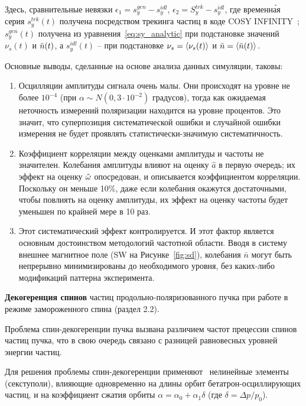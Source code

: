 Здесь, сравнительные невязки ${\epsilon_1 = s_y^{gen} - s_y^{idl}}$, ${\epsilon_2 = S_y^{trk} - s_y^{idl}}$,
где временн\'{а}я серия $s_y^{trk}(t)$ получена посредством трекинга частиц 
в коде COSY INFINITY~\cite{COSYINF:Website}; $s_y^{gen}(t)$ получена из уравнения~\eqref{eq:sy_analytic}
при подстановке значений $\nu_s(t)$ и $\bar n(t)$, а $s_y^{idl}(t)$ -- при подстановке ${\nu_s=\avg{\nu_s(t)}}$ и 
${\nbar = \avg{\nbar(t)}}$.


Основные выводы, сделанные на основе анализа данных симуляции, таковы:
\begin{enumerate}
	\item Осцилляции амплитуды сигнала очень малы. Они происходят на уровне не более $10^{-4}$ (при
	${\alpha\sim N(0, 3\cdot 10^{-2})}$ градусов), тогда как ожидаемая неточность измерений поляризации находится
	на уровне процентов. Это значит, что суперпозиция систематической ошибки и случайной ошибки измерения
	не будет проявлять статистически-значимую систематичность.
	\item Коэффициент корреляции между оценками амплитуды и частоты не значителен. Колебания амплитуды
	влияют на оценку $\hat a$ в первую очередь; их эффект на оценку $\hat{\omega}$ опосредован, и описывается
	коэффициентом корреляции. Поскольку он меньше 10\%, даже если колебания окажутся достаточными, чтобы повлиять
	на оценку амплитуды, их эффект на оценку частоты будет уменьшен по крайней мере в 10 раз.
	\item Этот систематический эффект контролируется. И этот фактор является основным достоинством методологий
	частотной области. Вводя в систему внешнее магнитное поле (SW на Рисунке~\ref{fig:sd}), 
	колебания $\bar n$ могут быть 
	непрерывно минимизированы  до необходимого уровня, без каких-либо модификаций паттерна эксперимента.
\end{enumerate}

\textbf{Декогеренция спинов} частиц продольно-поляризованного пучка 
при работе в режиме замороженного спина (раздел 2.2).

Проблема спин-декогеренции пучка вызвана различием частот прецессии спинов частиц пучка, 
что в свою очередь связано с разницей равновесных уровней энергии частиц. 

Для решения проблемы спин-декогеренции применяют~\cite{COSY:SCT:IPAC15, COSY:SCT:1000sec} 
нелинейные элементы (секступоли), влияющие одновременно на длины орбит бетатрон-осциллирующих частиц,  
и на коэффициент сжатия орбиты ${\alpha = \alpha_0 + \alpha_1\delta}$ (где ${\delta=\Delta p/p_0}$).

